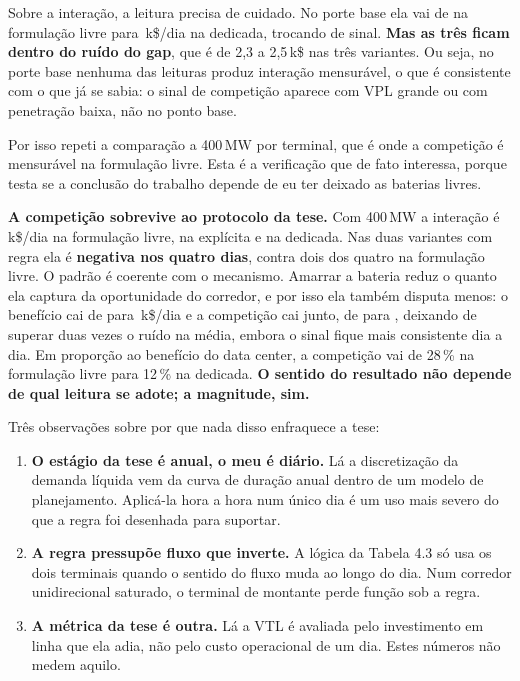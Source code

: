 \documentclass[11pt,a4paper]{article}
\begin{document}
Sobre a interação, a leitura precisa de cuidado. No porte base ela vai de \numIbase{} na formulação livre
para \numIdedic{}\,k\$/dia na dedicada, trocando de sinal. \textbf{Mas as três ficam dentro do ruído do
gap}, que é de 2,3 a 2,5\,k\$ nas três variantes. Ou seja, no porte base nenhuma das leituras produz
interação mensurável, o que é consistente com o que já se sabia: o sinal de competição aparece com VPL
grande ou com penetração baixa, não no ponto base.

Por isso repeti a comparação a 400\,MW por terminal, que é onde a competição é mensurável na formulação
livre. Esta é a verificação que de fato interessa, porque testa se a conclusão do trabalho depende de eu
ter deixado as baterias livres.

\begin{table}[htbp]
\centering\small
\caption{As três leituras com VPL de 400\,MW por terminal (k\$/dia, médias dos quatro dias).}
\tableiturasbig
\end{table}

\textbf{A competição sobrevive ao protocolo da tese.} Com 400\,MW a interação é
\numIbigemerg{}\,k\$/dia na formulação livre, \numIbigexplic{} na explícita e \numIbigdedic{} na
dedicada. Nas duas variantes com regra ela é \textbf{negativa nos quatro dias}, contra dois dos quatro
na formulação livre.
O padrão é coerente com o mecanismo. Amarrar a bateria reduz o quanto ela captura da oportunidade do
corredor, e por isso ela também disputa menos: o benefício cai de \numdBbigemerg{} para
\numdBbigdedic{}\,k\$/dia e a competição cai junto, de \numIbigemerg{} para \numIbigdedic{}, deixando de
superar duas vezes o ruído na média, embora o sinal fique mais consistente dia a dia. Em proporção ao
benefício do data center, a competição vai de 28\,\% na formulação livre para 12\,\% na dedicada.
\textbf{O sentido do resultado não depende de qual leitura se adote; a magnitude, sim.}


Três observações sobre por que nada disso enfraquece a tese:

\begin{enumerate}
\item \textbf{O estágio da tese é anual, o meu é diário.} Lá a discretização da demanda líquida vem da
curva de duração anual dentro de um modelo de planejamento. Aplicá-la hora a hora num único dia é um uso
mais severo do que a regra foi desenhada para suportar.
\item \textbf{A regra pressupõe fluxo que inverte.} A lógica da Tabela 4.3 só usa os dois terminais quando
o sentido do fluxo muda ao longo do dia. Num corredor unidirecional saturado, o terminal de montante perde
função sob a regra.
\item \textbf{A métrica da tese é outra.} Lá a VTL é avaliada pelo investimento em linha que ela adia, não
pelo custo operacional de um dia. Estes números não medem aquilo.
\end{enumerate}
\end{document}
